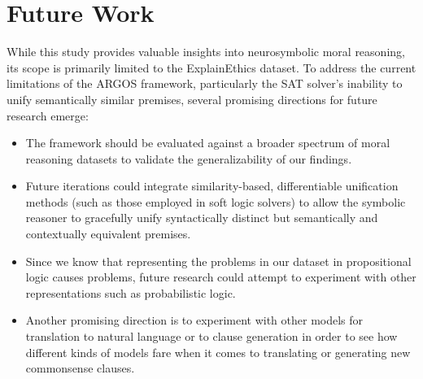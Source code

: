 \section{Future Work}
\label{sec:saran}
While this study provides valuable insights into neurosymbolic moral reasoning, its scope is primarily limited to the ExplainEthics dataset. To address the current limitations of the ARGOS framework, particularly the SAT solver's inability to unify semantically similar premises, several promising directions for future research emerge:
\begin{itemize}
    \item The framework should be evaluated against a broader spectrum of moral reasoning datasets to validate the generalizability of our findings.
    \item Future iterations could integrate similarity-based, differentiable unification methods (such as those employed in soft logic solvers) to allow the symbolic reasoner to gracefully unify syntactically distinct but semantically and contextually equivalent premises.
    \item Since we know that representing the problems in our dataset in propositional logic causes problems, future research could attempt to experiment with other representations such as probabilistic logic.
    \item Another promising direction is to experiment with other models for translation to natural language or to clause generation in order to see how different kinds of models fare when it comes to translating or generating new commonsense clauses.
\end{itemize}
